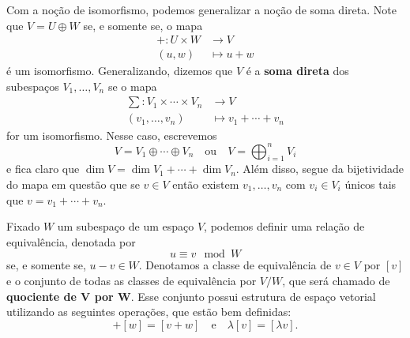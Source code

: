 Com a noção de isomorfismo, podemos generalizar a noção de soma direta. Note que $V = U \oplus W$ se, e somente se, o mapa \begin{equation}
    \begin{split}
        + \colon U \times W &\to V \\ (u,w) &\mapsto u + w
    \end{split}
\end{equation} é um isomorfismo. Generalizando, dizemos que $V$ é a \textbf{soma direta} dos subespaços $V_1, \dots, V_n$ se o mapa \begin{equation}
    \begin{split}
        \sum \colon V_1 \times \cdots \times V_n &\to V \\ (v_1, \dots, v_n) &\mapsto v_1 + \cdots + v_n
    \end{split}
\end{equation} for um isomorfismo. Nesse caso, escrevemos \begin{equation}
    V = V_1 \oplus \cdots \oplus V_n \quad \text{ou} \quad V = \bigoplus_{i = 1}^n V_i
\end{equation} e fica claro que $\dim V = \dim V_1 + \cdots + \dim V_n$. Além disso, segue da bijetividade do mapa em questão que se $v \in V$ então existem $v_1, \dots, v_n$ com $v_i \in V_i$ únicos tais que $v = v_1 + \cdots + v_n$.

Fixado $W$ um subespaço de um espaço $V$, podemos definir uma relação de equivalência, denotada por \begin{equation}
    u \equiv v \mod W
\end{equation} se, e somente se, $u - v \in W$. Denotamos a classe de equivalência de $v \in V$ por $[v]$ e o conjunto de todas as classes de equivalência por $V/W$, que será chamado de \textbf{quociente de V por W}. Esse conjunto possui estrutura de espaço vetorial utilizando as seguintes operações, que estão bem definidas: \begin{equation}
    [v] + [w] = [v + w] \quad \text{e} \quad \lambda [v] = [\lambda v].
\end{equation}


